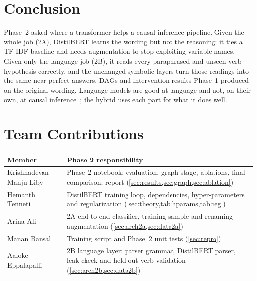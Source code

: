 \documentclass[12pt,a4paper]{article}
\newcommand{\MemberA}{Krishnadevan Manju Liby}
\newcommand{\MemberB}{Hemanth Tenneti}
\newcommand{\MemberC}{Arina Ali}
\newcommand{\MemberD}{Manan Bansal}
\newcommand{\MemberE}{Aaloke Eppalapalli}
\newcommand{\thead}[1]{\textbf{#1}}
\begin{document}
\section{Conclusion}\label{sec:conclusion}
Phase~2 asked where a transformer helps a causal-inference pipeline. Given the whole job (2A), DistilBERT learns the wording but
not the reasoning: it ties a TF-IDF baseline and needs augmentation to stop exploiting variable names. Given only the language job
(2B), it reads every paraphrased and unseen-verb hypothesis correctly, and the unchanged symbolic layers turn those readings into
the same near-perfect answers, DAGs and intervention results Phase~1 produced on the original wording. Language models are good
at language and not, on their own, at causal inference~\cite{kiciman2023}; the hybrid uses each part for what it does well.

\section{Team Contributions}
\begin{table}[!htbp]
\centering\small
\begin{tabularx}{\linewidth}{@{}lX@{}}
\toprule
\thead{Member} & \thead{Phase 2 responsibility} \\
\midrule
\MemberA & Phase~2 notebook: evaluation, graph stage, ablations, final comparison; report (\cref{sec:results,sec:graph,sec:ablation}) \\
\rowcolor{rowtint} \MemberB & DistilBERT training loop, dependencies, hyper-parameters and regularization (\cref{sec:theory,tab:hparams,tab:reg}) \\
\MemberC & 2A end-to-end classifier, training sample and renaming augmentation (\cref{sec:arch2a,sec:data2a}) \\
\rowcolor{rowtint} \MemberD & Training script and Phase~2 unit tests (\cref{sec:repro}) \\
\MemberE & 2B language layer: parser grammar, DistilBERT parser, leak check and held-out-verb validation (\cref{sec:arch2b,sec:data2b}) \\
\bottomrule
\end{tabularx}
\end{table}
\end{document}
